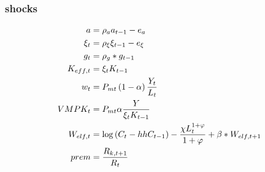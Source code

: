 \documentclass[document.tex]{subfiles}
\begin{document}
\subsubsection*{shocks}
\begin{align*}
a &= \rho_a a_{t-1} - e_a \\
\xi_t &= \rho_{\xi} \xi_{t-1} - e_{\xi} \\
g_t &= \rho_g *g_{t-1} \\
K_{eff, t} &= \xi_t K_{t-1} \\
w_t &= P_{mt} \left( 1 - \alpha \right) \frac{Y_t}{L_t} \\
VMPK_t &= P_{mt} \alpha \frac{Y}{\xi_t K_{t-1}} \\
W_{elf,t} &=  \log \left( C_t - hh C_{t-1} \right) 
- \frac{\chi L_t^{1+\varphi}}{1+\varphi} + \beta * W_{elf,t+1}  \\
prem &= \frac{R_{k,t+1}}{R_t} 
\end{align*}


\begin{comment}


//Shocks
//38. Welfare
Welf   =   log(exp(C)-hh*exp(C(-1)))
-chi*exp(L)^(1+varphi)/(1+varphi)+betta*Welf(+1);

//39. Premium
exp(prem)   =   exp(Rk(+1))/exp(R);

\end{comment}
\end{document}

